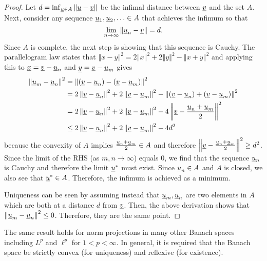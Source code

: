 \begin{proof}

Let $d=\inf_{\underline u\in A}\left\Vert \underline u-\underline v\right\Vert$ be the infimal distance between $\underline v$ and the set $A$.
Next, consider any sequence $\underline u_{1},\underline u_{2},\ldots\in A$ that achieves the infimum so that
\[
\lim_{n\rightarrow\infty}\left\Vert \underline u_{n}-\underline v\right\Vert =d.
\]
Since $A$ is complete, the next step is showing that this sequence is Cauchy. The parallelogram law states that $\left\Vert x-y\right\Vert ^{2}=2\left\Vert x\right\Vert ^{2}+2\left\Vert y\right\Vert ^{2}-\left\Vert x+y\right\Vert ^{2}$ and applying this to $\underline{x}=\underline{v}-\underline u_{n}$ and $\underline{y}=\underline{v}-\underline u_{m}$ gives
\begin{align*}
\left\Vert \underline u_{m}-\underline u_{n}\right\Vert ^{2} & =\left\Vert \left(\underline v-\underline u_{n}\right)-\left(\underline v-\underline u_{m}\right)\right\Vert ^{2}\\
 & =2\left\Vert \underline v-\underline u_{n}\right\Vert ^{2}+2\left\Vert \underline v-\underline u_{m}\right\Vert ^{2}-\left\Vert \left(\underline v-\underline u_{n}\right)+\left(\underline v-\underline u_{m}\right)\right\Vert ^{2}\\
 & =2\left\Vert \underline v-\underline u_{n}\right\Vert ^{2}+2\left\Vert \underline v-\underline u_{m}\right\Vert ^{2}-4\left\Vert \underline v-\frac{\underline u_{n}+\underline u_{m}}{2}\right\Vert ^{2}\\
 & \leq2\left\Vert \underline v-\underline u_{n}\right\Vert ^{2}+2\left\Vert \underline v-\underline u_{m}\right\Vert ^{2}-4d^{2}
\end{align*}
because the convexity of $A$ implies $\frac{\underline u_{n}+\underline u_{m}}{2}\in A$ and therefore $\left\Vert \underline v-\frac{\underline u_{n}+\underline u_{m}}{2}\right\Vert ^{2}\geq d^{2}$. Since the limit of the RHS (as $m,n\rightarrow\infty$) equals $0$, we find that the sequence $\underline u_{n}$ is Cauchy and therefore the limit $\underline u^{*}$ must exist. Since $\underline u_{n}\in A$ and $A$ is closed, we also see that $\underline u^{*}\in A$. Therefore, the infimum is achieved as a minimum.

Uniqueness can be seen by assuming instead that $\underline u_{m},\underline u_{n}$ are two elements in $A$ which are both at a distance $d$ from $\underline v$. Then, the above derivation shows that $\left\Vert \underline u_{m}-\underline u_{n}\right\Vert ^{2}\leq0$. Therefore, they are the same point.
\end{proof}

\begin{remark}
The same result holds for norm projections in many other Banach spaces including $L^{p}$ and $\ell^{p}$ for $1<p<\infty$. In general, it is required that the Banach space be strictly convex (for uniqueness) and reflexive (for existence).
\end{remark}



